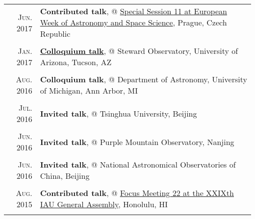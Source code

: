 \documentclass[letterpaper,12pt]{article}
\newcommand{\textwrap}{5.3in}       %
\begin{document}
\begin{longtable}{r|p{\textwrap}}

    \textsc{Jun. 2017}   &   \textbf{Contributed talk}, @
    \href{http://eas.unige.ch/EWASS2017/session.jsp?id=SS11}{Special Session 11 at
    European Week of Astronomy and Space Science}, Prague, Czech Republic   \\
    \multicolumn{2}{c}{} \\

    \textsc{Jan. 2017}   &   \href{http://mingus.as.arizona.edu/~bjw/galaxy_group/2017spring.html}{\textbf{Colloquium talk}}, @ Steward Observatory, University of Arizona, Tucson, AZ \\
    \multicolumn{2}{c}{} \\

    \textsc{Aug. 2016}   &   \textbf{Colloquium talk}, @ Department of Astronomy, University of Michigan, Ann Arbor, MI \\
    \multicolumn{2}{c}{} \\

    \textsc{Jul. 2016}   &   \textbf{Invited talk}, @ Tsinghua University, Beijing \\
    \multicolumn{2}{c}{} \\


    \textsc{Jun. 2016}   &   \textbf{Invited talk}, @ Purple Mountain Observatory, Nanjing \\
    \multicolumn{2}{c}{} \\

    \textsc{Jun. 2016}   &   \textbf{Invited talk}, @ National Astronomical Observatories of China, Beijing   \\
    \multicolumn{2}{c}{} \\

    \textsc{Aug. 2015}   &   \textbf{Contributed talk}, @ \href{http://hffiau.epfl.ch/page-116896.html}{Focus Meeting 22 at the XXIXth IAU General Assembly}, Honolulu, HI     \\
    \multicolumn{2}{c}{} \\


\end{longtable}
\end{document}
